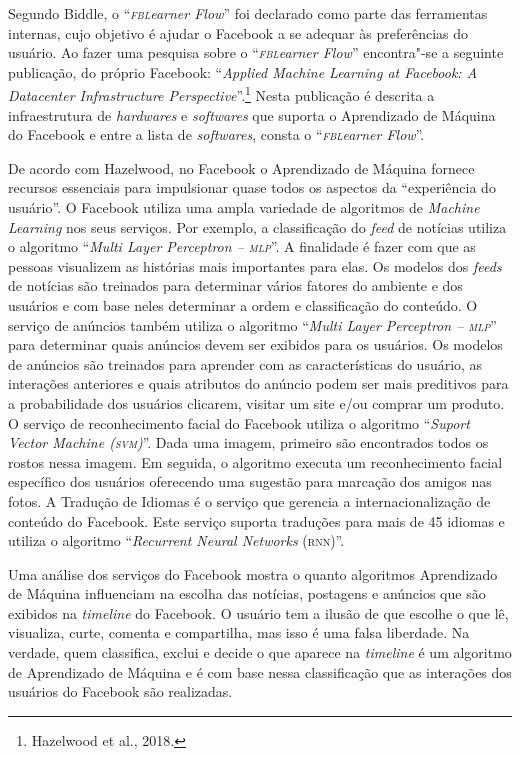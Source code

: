 Segundo Biddle, o ``\emph{\textsc{fbl}earner Flow}'' foi declarado como
parte das ferramentas internas, cujo objetivo é ajudar o Facebook a se
adequar às preferências do usuário. Ao fazer uma pesquisa sobre o
``\emph{\textsc{fbl}earner Flow}'' encontra"-se a seguinte publicação, do próprio
Facebook: ``\emph{Applied Machine Learning at Facebook: A Datacenter
Infrastructure Perspective}''.\footnote{Hazelwood et al., 2018.} Nesta
publicação é descrita a infraestrutura de \emph{hardwares} e \emph{softwares} que
suporta o Aprendizado de Máquina do Facebook e entre a lista de
\emph{softwares}, consta o ``\emph{\textsc{fbl}earner Flow}''.

De acordo com Hazelwood, no Facebook o Aprendizado de
Máquina fornece recursos essenciais para impulsionar quase todos os
aspectos da ``experiência do usuário''. O Facebook utiliza uma ampla
variedade de algoritmos de \emph{Machine Learning} nos seus serviços.
Por exemplo, a classificação do \emph{feed} de notícias utiliza o
algoritmo ``\emph{Multi Layer Perceptron -- \textsc{mlp}}''. A finalidade é fazer
com que as pessoas visualizem as histórias mais importantes para elas.
Os modelos dos \emph{feeds} de notícias são treinados para determinar
vários fatores do ambiente e dos usuários e com base neles determinar a
ordem e classificação do conteúdo. O serviço de anúncios também utiliza
o algoritmo ``\emph{Multi Layer Perceptron  -- \textsc{mlp}}'' para determinar
quais anúncios devem ser exibidos para os usuários. Os modelos de
anúncios são treinados para aprender com as características do usuário,
as interações anteriores e quais atributos do anúncio podem ser mais
preditivos para a probabilidade dos usuários clicarem, visitar um site
e/ou comprar um produto. O serviço de reconhecimento facial do Facebook
utiliza o algoritmo ``\emph{Suport Vector Machine (\textsc{svm})}''. Dada uma
imagem, primeiro são encontrados todos os rostos nessa imagem. Em
seguida, o algoritmo executa um reconhecimento facial específico dos
usuários oferecendo uma sugestão para marcação dos amigos nas fotos. A
Tradução de Idiomas é o serviço que gerencia a internacionalização de
conteúdo do Facebook. Este serviço suporta traduções para mais de 45
idiomas e utiliza o algoritmo ``\emph{Recurrent Neural Networks}
(\textsc{rnn})''.

Uma análise dos serviços do Facebook mostra o quanto algoritmos
Aprendizado de Máquina influenciam na escolha das notícias, postagens e
anúncios que são exibidos na \emph{timeline} do Facebook. O usuário tem
a ilusão de que escolhe o que lê, visualiza, curte, comenta e
compartilha, mas isso é uma falsa liberdade. Na verdade, quem
classifica, exclui e decide o que aparece na \emph{timeline} é um
algoritmo de Aprendizado de Máquina e é com base nessa classificação que
as interações dos usuários do Facebook são realizadas.

